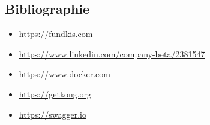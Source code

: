 \documentclass[a4paper, 12pt]{article}
\begin{document}
\newpage
\subsection*{Bibliographie}

\begin{itemize}
\item \url{https://fundkis.com}
\item \url{https://www.linkedin.com/company-beta/2381547}
\item \url{https://www.docker.com}
\item \url{https://getkong.org}
\item \url{https://swagger.io}
\end{itemize}
\label{fin}


\end{document}
